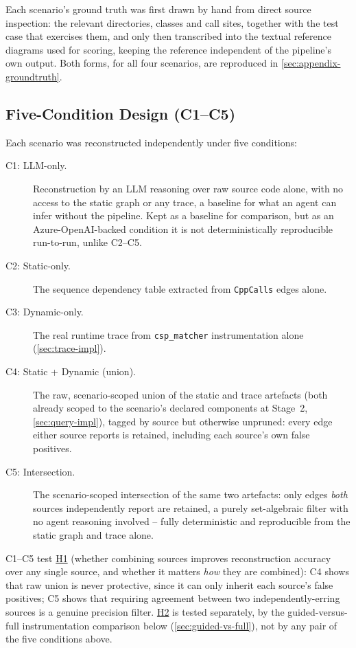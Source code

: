 Each scenario's ground truth was first drawn by hand from direct source
inspection: the relevant directories, classes and call sites, together
with the test case that exercises them, and only then transcribed into
the \sysml textual reference diagrams used for scoring, keeping the
reference independent of the pipeline's own output. Both forms, for
all four scenarios, are reproduced in
\cref{sec:appendix-groundtruth}.

\subsection{Five-Condition Design (C1--C5)}\label{sec:conditions}

Each scenario was reconstructed independently under five conditions:

\begin{description}
  \item[C1: LLM-only.] Reconstruction by an \ac{LLM} reasoning over raw
    source code alone, with no access to the static graph or any trace,
    a baseline for what an agent can infer without the pipeline. Kept as
    a baseline for comparison, but as an Azure-OpenAI-backed condition
    it is not deterministically reproducible run-to-run, unlike C2--C5.
  \item[C2: Static-only.] The sequence dependency table extracted from
    \texttt{CppCalls} edges alone.
  \item[C3: Dynamic-only.] The real runtime trace from \texttt{csp\_matcher}
    instrumentation alone (\cref{sec:trace-impl}).
  \item[C4: Static + Dynamic (union).] The raw, scenario-scoped union
    of the static and trace artefacts (both already scoped to the
    scenario's declared components at Stage~2, \cref{sec:query-impl}),
    tagged by source but otherwise unpruned: every edge either source
    reports is retained, including each source's own false positives.
  \item[C5: Intersection.] The scenario-scoped intersection of the same
    two artefacts: only edges \emph{both} sources independently report
    are retained, a purely set-algebraic filter with no agent reasoning
    involved -- fully deterministic and reproducible from the static
    graph and trace alone.
\end{description}

C1--C5 test \hyperref[sec:h1]{H1} (whether combining sources improves
reconstruction accuracy over any single source, and whether it matters
\emph{how} they are combined): C4 shows that raw union is never
protective, since it can only inherit each source's false positives; C5
shows that requiring agreement between two independently-erring sources
is a genuine precision filter. \hyperref[sec:h2]{H2} is tested separately,
by the guided-versus-full instrumentation comparison below
(\cref{sec:guided-vs-full}), not by any pair of the five conditions
above.

